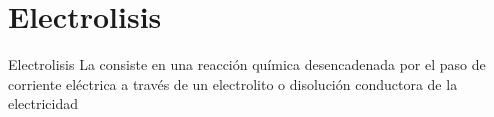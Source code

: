 %
%
%
%
%
%




    \section{Electrolisis}\label{sec:electrolisis}

    \begin{center}
        \begin{definicion}[width=0.9\textwidth]{Electrolisis}
            La  consiste en una reacción química desencadenada por el paso de corriente eléctrica a través de un electrolito o disolución conductora de la electricidad
        \end{definicion}
    \end{center}



